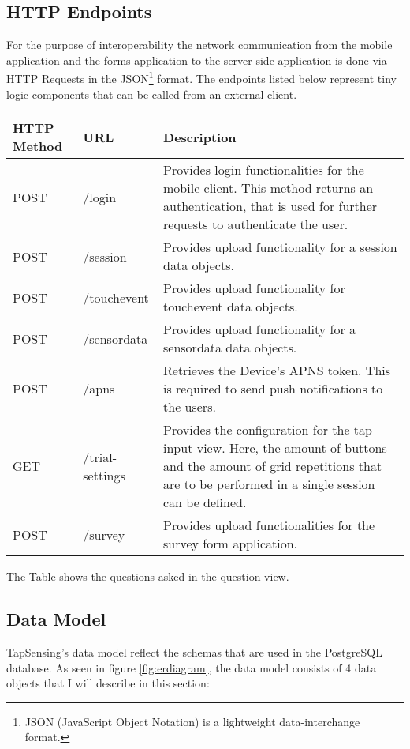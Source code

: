 \subsection{HTTP Endpoints}
\label{sec:endpoints}
For the purpose of interoperability the network communication from the mobile application and the forms application to the server-side application is done via HTTP Requests in the JSON\footnote{JSON (JavaScript Object Notation)\cite{ietf-jsonbis-rfc7159bis-04} is a lightweight data-interchange format.} format. The endpoints listed below represent tiny logic components that can be called from an external client.
\begin{center}
  \begin{tabular}{|p{2cm}|p{4cm}|p{8cm}|}
  \hline
  \textbf{HTTP \newline Method} & \textbf{URL} & \textbf{Description} \\ \hline
  POST & /login & Provides login functionalities for the mobile client. This method returns an authentication, that is used for further requests to authenticate the user.\\
  \hline
  POST & /session & Provides upload functionality for a session data objects.\\
  \hline
  POST & /touchevent & Provides upload functionality for touchevent data objects.\\
  \hline
  POST & /sensordata & Provides upload functionality for a sensordata data objects.\\
  \hline
  POST & /apns & Retrieves the Device's APNS token. This is required to send push notifications to the users.\\
  \hline
  GET & /trial-settings & Provides the configuration for the tap input view. Here, the amount of buttons and the amount of grid repetitions that are to be performed in a single session can be defined.\\
  \hline
  POST & /survey & Provides upload functionalities for the survey form application.\\
  \hline

  \end{tabular}
  \caption{The Table shows the questions asked in the question view.}
\end{center}

\subsection{Data Model}
TapSensing's data model reflect the schemas that are used in the PostgreSQL database. As seen in figure \ref{fig:erdiagram}, the data model consists of 4 data objects that I will describe in this section:

